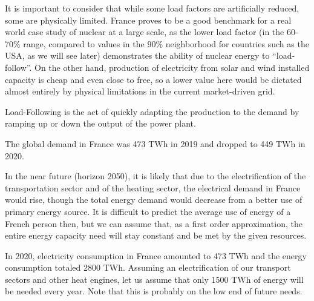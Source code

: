 It is important to consider that while some load factors are artificially reduced, some are physically limited. France proves to be a good benchmark for a real world case study of nuclear at a large scale, as the lower load factor (in the 60-70\% range, compared to values in the 90\% neighborhood for countries such as the USA, as we will see later) demonstrates the ability of nuclear energy to “load-follow”. On the other hand, production of electricity from solar and wind installed capacity is cheap and even close to free, so a lower value here would be dictated almost entirely by physical limitations in the current market-driven grid.


\begin{kaobox}[frametitle=Load Follow]
Load-Following is the act of quickly adapting the production to the demand by ramping up or down the output of the power plant.
\end{kaobox}

The global demand in France was 473 TWh in 2019 and dropped to 449 TWh in 2020.


In the near future (horizon 2050), it is likely that due to the electrification of the transportation sector and of the heating sector, the electrical demand in France would rise, though the total energy demand would decrease from a better use of primary energy source. It is difficult to predict the average use of energy of a French person then, but we can assume that, as a first order approximation, the entire energy capacity need will stay constant and be met by the given resources.

In 2020, electricity consumption in France amounted to 473 TWh and the energy consumption totaled 2800 TWh.  Assuming an electrification of our transport sectors and other heat engines, let us assume that only 1500 TWh of energy will be needed every year. Note that this is probably on the low end of future needs.




